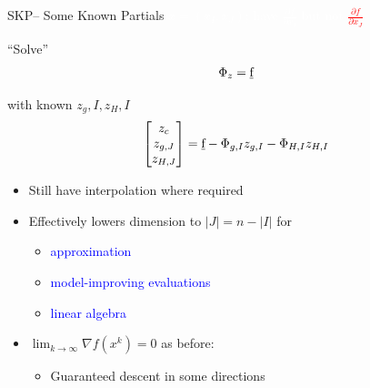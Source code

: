 \documentclass[handout,aspectratio=54]{beamer}
\numberwithin{theorem}{section}
\begin{document}
\begin{frame}{SKP– Some Known Partials}
\colorbox[rgb]{0.5,0.6,0.7}{\textcolor{white}{$x=(x_I,x_J)$; have $\frac{\partial f}{\partial x_I}$ but not} \textcolor{red}{$\frac{\partial f}{\partial x_J}$}}

\vspace{0.1cm}
“Solve”
\begin{equation*}
\Phi_z=\underline{\textup{f}}
\end{equation*}

with known  $z_g,I,z_H,I$
\begin{equation*}
[\Phi_c\quad\Phi_{g,J}\quad\Phi_{H,J}]
\begin{bmatrix}
z_c\\
z_{g,J}\\
z_{H,J}
\end{bmatrix}
=\underline{\textup{f}}-\Phi_{g,I}z_{g,I}-\Phi_{H,I}z_{H,I}
\end{equation*}

\begin{itemize}
\item Still have interpolation where required
\item Effectively lowers dimension to $|J|=n-|I|$ for
	\begin{itemize}
	\item \textcolor{blue}{approximation}
	\item \textcolor{blue}{model-improving evaluations}
	\item \textcolor{blue}{linear algebra}
	\end{itemize}
\item $\lim_{k\to\infty}\nabla f(x^k)=0$ as before:
	\begin{itemize}
	\item Guaranteed descent in some directions
	\end{itemize}
\end{itemize}
\end{frame}
\end{document}
